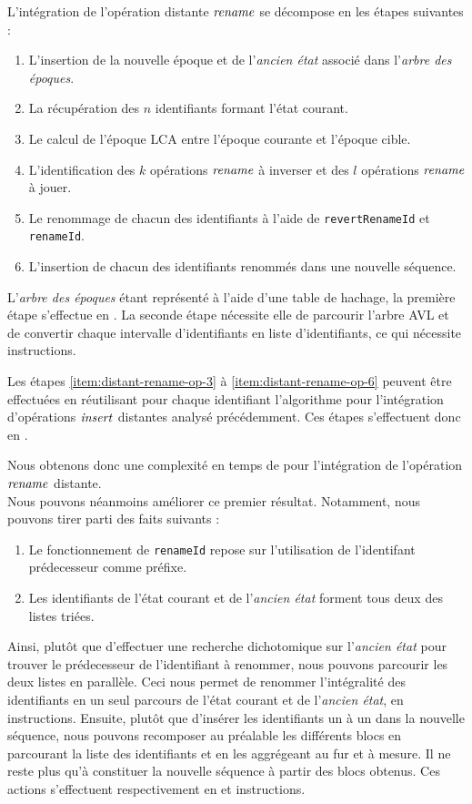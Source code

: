 L'intégration de l'opération distante $\mathit{rename}$ se décompose en les étapes suivantes :
\begin{enumerate}
  \item L'insertion de la nouvelle époque et de l'\emph{ancien état} associé dans l'\emph{arbre des époques}.
  \item La récupération des $n$ identifiants formant l'état courant.
  \item \label{item:distant-rename-op-3} Le calcul de l'époque \ac{LCA} entre l'époque courante et l'époque cible.
  \item L'identification des $k$ opérations $\mathit{rename}$ à inverser et des $l$ opérations $\mathit{rename}$ à jouer.
  \item Le renommage de chacun des identifiants à l'aide de \texttt{revertRenameId} et \texttt{renameId}.
  \item \label{item:distant-rename-op-6} L'insertion de chacun des identifiants renommés dans une nouvelle séquence.
\end{enumerate}
L'\emph{arbre des époques} étant représenté à l'aide d'une table de hachage, la première étape s'effectue en .
La seconde étape nécessite elle de parcourir l'arbre AVL et de convertir chaque intervalle d'identifiants en liste d'identifiants, ce qui nécessite  instructions.

Les étapes \ref{item:distant-rename-op-3} à \ref{item:distant-rename-op-6} peuvent être effectuées en réutilisant pour chaque identifiant l'algorithme pour l'intégration d'opérations $\mathit{insert}$ distantes analysé précédemment.
Ces étapes s'effectuent donc en .

Nous obtenons donc une complexité en temps de  pour l'intégration de l'opération $\mathit{rename}$ distante.\\

Nous pouvons néanmoins améliorer ce premier résultat.
Notamment, nous pouvons tirer parti des faits suivants :
\begin{enumerate}
  \item Le fonctionnement de \texttt{renameId} repose sur l'utilisation de l'identifant prédecesseur comme préfixe.
  \item Les identifiants de l'état courant et de l'\emph{ancien état} forment tous deux des listes triées.
\end{enumerate}
Ainsi, plutôt que d'effectuer une recherche dichotomique sur l'\emph{ancien état} pour trouver le prédecesseur de l'identifiant à renommer, nous pouvons parcourir les deux listes en parallèle.
Ceci nous permet de renommer l'intégralité des identifiants en un seul parcours de l'état courant et de l'\emph{ancien état}, \ie en  instructions.
Ensuite, plutôt que d'insérer les identifiants un à un dans la nouvelle séquence, nous pouvons recomposer au préalable les différents blocs en parcourant la liste des identifiants et en les aggrégeant au fur et à mesure.
Il ne reste plus qu'à constituer la nouvelle séquence à partir des blocs obtenus.
Ces actions s'effectuent respectivement en  et  instructions.\\

